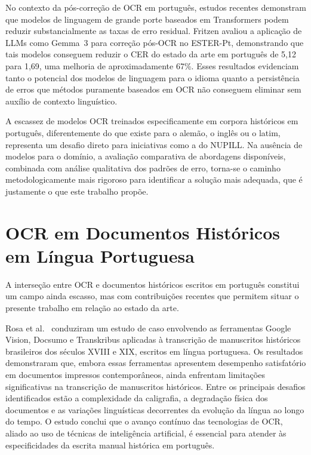 \documentclass[
  12pt,
  oneside,
  a4paper,
  chapter=TITLE,
  section=TITLE,
  english,
  brazil
]{abntex2}
\begin{document}
No contexto da pós-correção de OCR em português, estudos recentes demonstram que modelos
de linguagem de grande porte baseados em Transformers podem reduzir substancialmente as
taxas de erro residual. Fritzen \cite{fritzen2025} avaliou a aplicação de LLMs como
Gemma~3 para correção pós-OCR no ESTER-Pt, demonstrando que tais modelos conseguem
reduzir o CER do estado da arte em português de 5,12 para 1,69, uma melhoria de
aproximadamente 67\%. Esses resultados evidenciam tanto o potencial dos modelos de
linguagem para o idioma quanto a persistência de erros que métodos puramente baseados em
OCR não conseguem eliminar sem auxílio de contexto linguístico.

A escassez de modelos OCR treinados especificamente em corpora históricos em português,
diferentemente do que existe para o alemão, o inglês ou o latim, representa um desafio
direto para iniciativas como a do NUPILL. Na ausência de modelos para o domínio, a
avaliação comparativa de abordagens disponíveis, combinada com análise qualitativa dos
padrões de erro, torna-se o caminho metodologicamente mais rigoroso para identificar a
solução mais adequada, que é justamente o que este trabalho propõe.

\section{OCR em Documentos Históricos em Língua Portuguesa}
\label{sec:ocr_historico_pt}

A interseção entre OCR e documentos históricos escritos em português constitui um campo
ainda escasso, mas com contribuições recentes que permitem situar o presente trabalho em
relação ao estado da arte.

Rosa et al.\ \cite{rosa2025} conduziram um estudo de caso envolvendo as ferramentas
Google Vision, Docsumo e Transkribus aplicadas à transcrição de manuscritos históricos
brasileiros dos séculos XVIII e XIX, escritos em língua portuguesa. Os resultados
demonstraram que, embora essas ferramentas apresentem desempenho satisfatório em
documentos impressos contemporâneos, ainda enfrentam limitações significativas na
transcrição de manuscritos históricos. Entre os principais desafios identificados estão
a complexidade da caligrafia, a degradação física dos documentos e as variações
linguísticas decorrentes da evolução da língua ao longo do tempo. O estudo conclui que
o avanço contínuo das tecnologias de OCR, aliado ao uso de técnicas de inteligência
artificial, é essencial para atender às especificidades da escrita manual histórica em
português.
\end{document}
